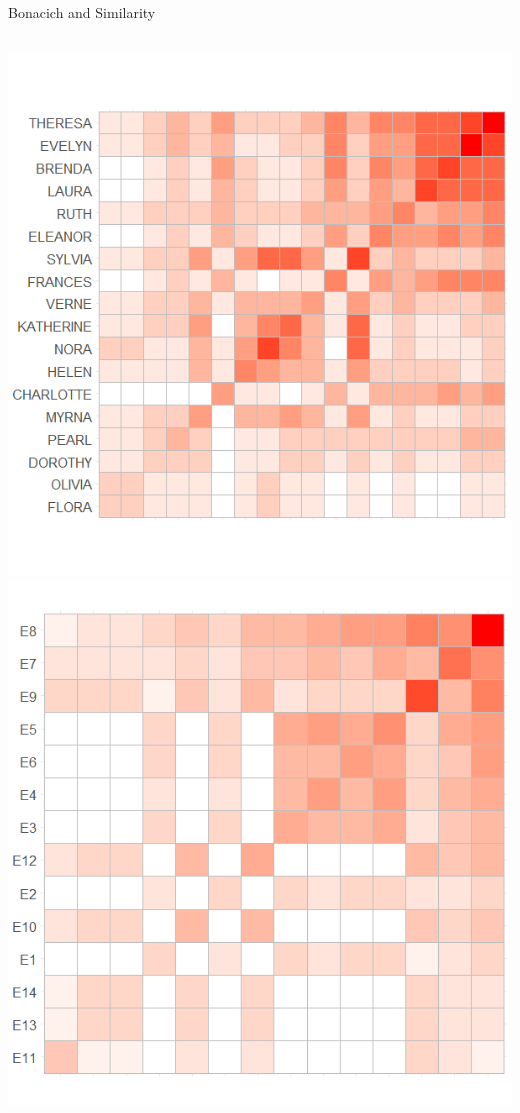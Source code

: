 \documentclass[
  ignorenonframetext,
]{beamer}
\begin{document}
\begin{frame}{Bonacich and Similarity}
\protect\hypertarget{bonacich-and-similarity}{}
\begin{columns}[T]
\begin{column}{0.3\textwidth}
\includegraphics{Plots/bon-sim-p.png}
\includegraphics{Plots/bon-sim-g.png}
\end{column}


\end{columns}
\end{frame}
\end{document}
